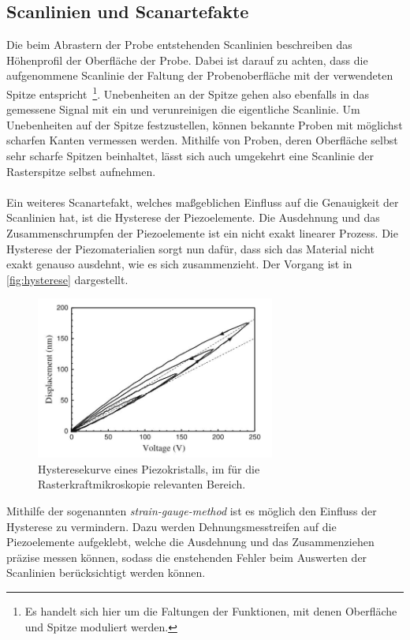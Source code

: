 \subsection{Scanlinien und Scanartefakte}
Die beim Abrastern der Probe entstehenden Scanlinien beschreiben das Höhenprofil der Oberfläche der Probe. Dabei ist darauf zu achten, dass die aufgenommene Scanlinie der Faltung der Probenoberfläche mit der verwendeten Spitze entspricht~\footnote{Es handelt sich hier um die Faltungen der Funktionen, mit denen Oberfläche und Spitze moduliert werden.}. Unebenheiten an der Spitze gehen also ebenfalls in das gemessene Signal mit ein und verunreinigen die eigentliche Scanlinie. Um Unebenheiten auf der Spitze festzustellen, können bekannte Proben mit möglichst scharfen Kanten vermessen werden. Mithilfe von Proben, deren Oberfläche selbst sehr scharfe Spitzen beinhaltet, lässt sich auch umgekehrt eine Scanlinie der Rasterspitze selbst aufnehmen.\\
\\
Ein weiteres Scanartefakt, welches maßgeblichen Einfluss auf die Genauigkeit der Scanlinien hat, ist die Hysterese der Piezoelemente. Die Ausdehnung und das Zusammenschrumpfen der Piezoelemente ist ein nicht exakt linearer Prozess. Die Hysterese der Piezomaterialien sorgt nun dafür, dass sich das Material nicht exakt genauso ausdehnt, wie es sich zusammenzieht. Der Vorgang ist in \autoref{fig:hysterese} dargestellt.
\begin{figure}[H]
  \includegraphics[width=0.7\textwidth]{content/plots/hysterese.jpg}
  \caption{Hysteresekurve eines Piezokristalls, im für die Rasterkraftmikroskopie relevanten Bereich. \cite{Voigt}}
  \label{fig:hysterese}
\end{figure}
Mithilfe der sogenannten \textit{strain-gauge-method} ist es möglich den Einfluss der Hysterese zu vermindern. Dazu werden Dehnungsmesstreifen auf die Piezoelemente aufgeklebt, welche die Ausdehnung und das Zusammenziehen präzise messen können, sodass die enstehenden Fehler beim Auswerten der Scanlinien berücksichtigt werden können.\\
